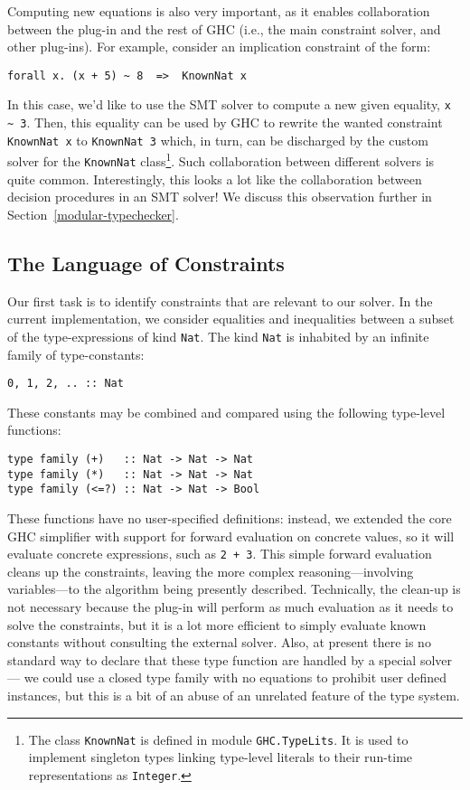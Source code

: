 \documentclass{sigplanconf}
\begin{document}
Computing new equations is also very important, as it enables collaboration
between the plug-in and the rest of GHC (i.e., the main constraint solver,
and other plug-ins).  For example, consider an implication constraint
of the form:
\begin{Verbatim}
forall x. (x + 5) ~ 8  =>  KnownNat x
\end{Verbatim}
In this case, we'd like to use the SMT solver to compute a new given
equality, \Verb"x ~ 3".  Then, this equality can be used by GHC to
rewrite the wanted constraint \Verb"KnownNat x" to \Verb"KnownNat 3"
which, in turn, can be discharged by the custom solver for the \Verb"KnownNat"
class\footnote{The class \Verb"KnownNat" is defined in module
\Verb"GHC.TypeLits".  It is used to implement singleton types linking
type-level literals to their run-time representations as \Verb"Integer".}.
Such collaboration between different solvers is quite common.
Interestingly, this looks a lot like the collaboration between decision
procedures in an SMT solver!  We discuss this observation further
in Section~\ref{modular-typechecker}.




\subsection{The Language of Constraints}
Our first task is to identify constraints that are relevant to our solver.
In the current implementation, we consider equalities and inequalities
between a subset of the type-expressions of kind \Verb"Nat".
The kind \Verb"Nat" is
inhabited by an infinite family of type-constants:
\begin{Verbatim}
0, 1, 2, .. :: Nat
\end{Verbatim}
These constants may be combined and compared using the following
type-level functions:
\begin{Verbatim}
type family (+)   :: Nat -> Nat -> Nat
type family (*)   :: Nat -> Nat -> Nat
type family (<=?) :: Nat -> Nat -> Bool
\end{Verbatim}
These functions have no user-specified definitions: instead, we extended
the core GHC simplifier with support for forward evaluation on concrete
values, so it will evaluate concrete expressions, such as \Verb"2 + 3".
This simple forward evaluation cleans up the constraints, leaving the more
complex reasoning---involving variables---to the algorithm being presently
described.  Technically, the clean-up is not necessary because the
plug-in will perform as much evaluation as it needs to solve the constraints,
but it is a lot more efficient to simply evaluate known constants without
consulting the external solver.  Also, at present there is no standard
way to declare that these type function are handled by a special solver---%
we could use a closed type family with no equations to prohibit user
defined instances, but this is a bit of an abuse of an unrelated feature
of the type system.
\end{document}
